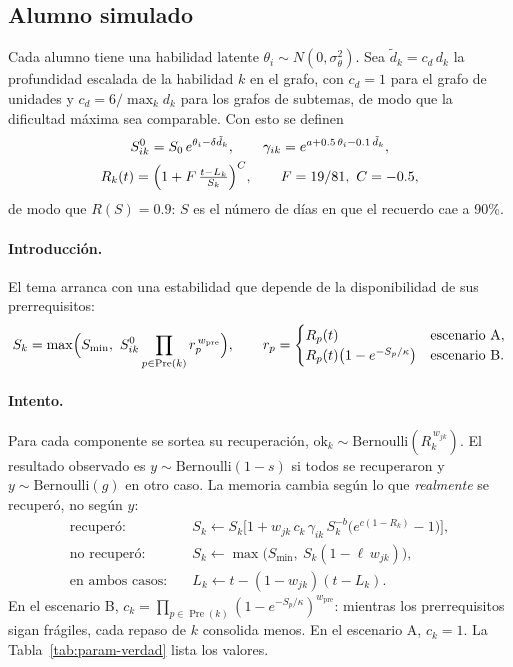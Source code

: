\documentclass[11pt]{article}
\theoremstyle{definition}
\theoremstyle{remark}
\newcommand{\Pre}{\operatorname{Pre}}
\newcommand{\Smin}{S_{\min}}
\begin{document}
\subsection{Alumno simulado}

Cada alumno tiene una habilidad latente $\theta_i\sim N(0,\sigma_\theta^2)$. Sea $\tilde d_k=c_d\,d_k$ la profundidad escalada de la habilidad $k$ en el grafo, con $c_d=1$ para el grafo de unidades y $c_d=6/\max_k d_k$ para los grafos de subtemas, de modo que la dificultad máxima sea comparable. Con esto se definen
\begin{gather}
S^{0}_{ik}=S_0\,e^{\theta_i-\delta\tilde d_k},\qquad \gamma_{ik}=e^{a+0.5\,\theta_i-0.1\,\tilde d_k},\label{eq:v-alumno}\\
R_k(t)=\Bigl(1+F\,\tfrac{t-L_k}{S_k}\Bigr)^{C},\qquad F=19/81,\ C=-0.5,\label{eq:v-olvido}
\end{gather}
de modo que $R(S)=0.9$: $S$ es el número de días en que el recuerdo cae a 90\%.

\paragraph{Introducción.} El tema arranca con una estabilidad que depende de la disponibilidad de sus prerrequisitos:
\begin{equation}
S_k=\max\Bigl(\Smin,\ S^{0}_{ik}\prod_{p\in\Pre(k)}r_p^{\,w_{\mathrm{pre}}}\Bigr),\qquad
r_p=\begin{cases}R_p(t) & \text{escenario A},\\ R_p(t)\bigl(1-e^{-S_p/\kappa}\bigr) & \text{escenario B}.\end{cases}
\label{eq:v-intro}
\end{equation}

\paragraph{Intento.} Para cada componente se sortea su recuperación, $\mathrm{ok}_k\sim\mathrm{Bernoulli}(R_k^{\,w_{jk}})$. El resultado observado es $y\sim\mathrm{Bernoulli}(1-s)$ si todos se recuperaron y $y\sim\mathrm{Bernoulli}(g)$ en otro caso. La memoria cambia según lo que \emph{realmente} se recuperó, no según $y$:
\begin{align}
\text{recuperó:}\quad & S_k\leftarrow S_k\bigl[1+w_{jk}\,c_k\,\gamma_{ik}\,S_k^{-b}\bigl(e^{c(1-R_k)}-1\bigr)\bigr],\label{eq:v-exito}\\
\text{no recuperó:}\quad & S_k\leftarrow\max\bigl(\Smin,\ S_k(1-\ell\,w_{jk})\bigr),\label{eq:v-lapso}\\
\text{en ambos casos:}\quad & L_k\leftarrow t-(1-w_{jk})(t-L_k).\label{eq:v-reloj}
\end{align}
En el escenario B, $c_k=\prod_{p\in\Pre(k)}(1-e^{-S_p/\kappa})^{w_{\mathrm{pre}}}$: mientras los prerrequisitos sigan frágiles, cada repaso de $k$ consolida menos. En el escenario A, $c_k=1$. La Tabla~\ref{tab:param-verdad} lista los valores.
\end{document}
